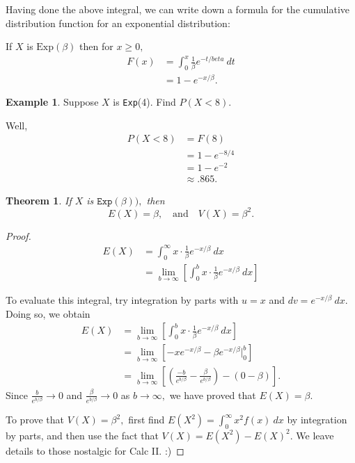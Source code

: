 \documentclass[
]{book}
\newtheorem{theorem}{Theorem}[chapter]
\theoremstyle{definition}
\theoremstyle{definition}
\newtheorem{example}{Example}[chapter]
\theoremstyle{definition}
\theoremstyle{definition}
\theoremstyle{remark}
\begin{document}
Having done the above integral, we can write down a formula for the cumulative distribution function for an exponential distribution:

If \(X\) is \(\text{Exp}(\beta)\) then for \(x \geq 0,\)
\begin{align*}
F(x) &= \int_0^x \frac{1}{\beta}e^{-t/beta}~dt\\
    &= 1 - e^{-x/\beta}.
\end{align*}

\begin{example}
Suppose \(X\) is \texttt{Exp}(4). Find \(P(X < 8)\).

Well,
\begin{align*}
P(X < 8) &= F(8)\\
        &= 1 - e^{-8/4} \\
        &= 1 - e^{-2} \\
        &\approx .865.
\end{align*}
\end{example}

\begin{theorem}
\protect\hypertarget{thm:exponential-EandV}{}\label{thm:exponential-EandV}If \(X\) is \(\texttt{Exp}(\beta)),\) then \[E(X) = \beta, ~~~ \text{ and } ~~~ V(X) = \beta^2.\]
\end{theorem}

\begin{proof}
\begin{align*}
E(X)&= \int_0^\infty x\cdot\frac{1}{\beta} e^{-x/\beta}~dx \\
    &= \lim_{b \to \infty}\left[\int_0^b x\cdot\frac{1}{\beta} e^{-x/\beta}~dx\right]
\end{align*}

To evaluate this integral, try integration by parts with \(u = x\) and \(dv = e^{-x/\beta}~dx\). Doing so, we obtain
\begin{align*}
E(X) &= \lim_{b \to \infty}\left[\int_0^b x\cdot\frac{1}{\beta} e^{-x/\beta}~dx\right]\\
    &= \lim_{b \to \infty}\left[-xe^{-x/\beta} - \beta e^{-x/\beta}\biggr|_0^b\right]\\
    &= \lim_{b \to \infty}\left[\left(\frac{-b}{e^{b/\beta}} - \frac{\beta}{e^{b/\beta}}\right) - \left(0 - \beta\right)\right].
\end{align*}
Since \(\displaystyle \frac{b}{e^{b/\beta}} \to 0\) and \(\displaystyle \frac{\beta}{e^{b/\beta}} \to 0\) as \(b \to \infty,\) we have proved that \(E(X) = \beta.\)

To prove that \(V(X) = \beta^2,\) first find \(E(X^2)=\int_0^\infty x^2 f(x)~dx\) by integration by parts, and then use the fact that \(V(X) = E(X^2)-E(X)^2\). We leave details to those nostalgic for Calc II. :)
\end{proof}
\end{document}
